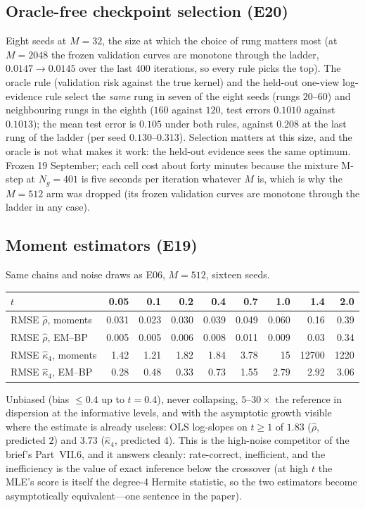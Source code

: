 \subsection{Oracle-free checkpoint selection (E20)}
Eight seeds at $M=32$, the size at which the choice of rung matters most (at $M=2048$ the frozen validation curves are monotone through the ladder, $0.0147\to0.0145$ over the last $400$ iterations, so every rule picks the top). The oracle rule (validation risk against the true kernel) and the held-out one-view log-evidence rule select the \emph{same} rung in seven of the eight seeds (rungs $20$--$60$) and neighbouring rungs in the eighth ($160$ against $120$, test errors $0.1010$ against $0.1013$); the mean test error is $0.105$ under both rules, against $0.208$ at the last rung of the ladder (per seed $0.130$--$0.313$). Selection matters at this size, and the oracle is not what makes it work: the held-out evidence sees the same optimum. Frozen 19 September; each cell cost about forty minutes because the mixture M-step at $N_g=401$ is five seconds per iteration whatever $M$ is, which is why the $M=512$ arm was dropped (its frozen validation curves are monotone through the ladder in any case).

\subsection{Moment estimators (E19)}
\label{sec:e19}
Same chains and noise draws as E06, $M=512$, sixteen seeds.

\begin{center}\small
\begin{tabular}{@{}lrrrrrrrr@{}}
\toprule
$t$ & 0.05 & 0.1 & 0.2 & 0.4 & 0.7 & 1.0 & 1.4 & 2.0 \\
\midrule
RMSE $\hat\rho$, moments & 0.031 & 0.023 & 0.030 & 0.039 & 0.049 & 0.060 & 0.16 & 0.39 \\
RMSE $\hat\rho$, EM--BP & 0.005 & 0.005 & 0.006 & 0.008 & 0.011 & 0.009 & 0.03 & 0.34 \\
RMSE $\hat\kappa_4$, moments & 1.42 & 1.21 & 1.82 & 1.84 & 3.78 & 15 & 12700 & 1220 \\
RMSE $\hat\kappa_4$, EM--BP & 0.28 & 0.48 & 0.33 & 0.73 & 1.55 & 2.79 & 2.92 & 3.06 \\
\bottomrule
\end{tabular}
\end{center}
 Unbiased (bias $\le0.4$ up to $t=0.4$), never collapsing, $5$--$30\times$ the reference in dispersion at the informative levels, and with the asymptotic growth visible where the estimate is already useless: OLS log-slopes on $t\ge1$ of $1.83$ ($\hat\rho$, predicted $2$) and $3.73$ ($\hat\kappa_4$, predicted $4$). This is the high-noise competitor of the brief's Part~VII.6, and it answers cleanly: rate-correct, inefficient, and the inefficiency is the value of exact inference below the crossover (at high $t$ the MLE's score is itself the degree-4 Hermite statistic, so the two estimators become asymptotically equivalent---one sentence in the paper).

